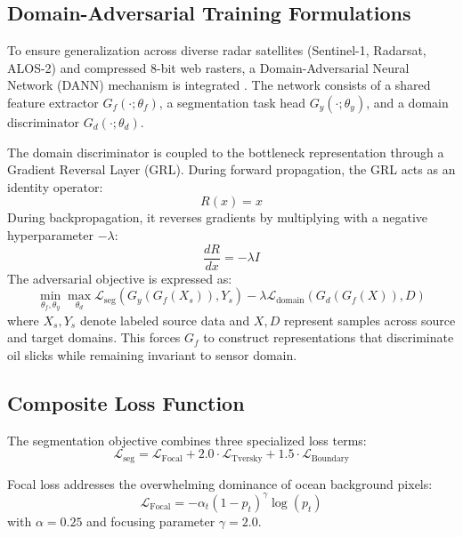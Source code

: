 \documentclass[conference]{IEEEtran}
\begin{document}
\subsection{Domain-Adversarial Training Formulations}
To ensure generalization across diverse radar satellites (Sentinel-1, Radarsat, ALOS-2) and compressed 8-bit web rasters, a Domain-Adversarial Neural Network (DANN) mechanism is integrated \cite{ganin2016domain}. The network consists of a shared feature extractor $G_f(\cdot; \theta_f)$, a segmentation task head $G_y(\cdot; \theta_y)$, and a domain discriminator $G_d(\cdot; \theta_d)$.

The domain discriminator is coupled to the bottleneck representation through a Gradient Reversal Layer (GRL). During forward propagation, the GRL acts as an identity operator:
\begin{equation}
R(x) = x
\label{eq:grl_forward}
\end{equation}
During backpropagation, it reverses gradients by multiplying with a negative hyperparameter $-\lambda$:
\begin{equation}
\frac{dR}{dx} = -\lambda I
\label{eq:grl_backward}
\end{equation}
The adversarial objective is expressed as:
\begin{equation}
\min_{\theta_f, \theta_y} \max_{\theta_d} \mathcal{L}_{\text{seg}}(G_y(G_f(X_s)), Y_s) - \lambda \mathcal{L}_{\text{domain}}(G_d(G_f(X)), D)
\label{eq:dann_objective}
\end{equation}
where $X_s, Y_s$ denote labeled source data and $X, D$ represent samples across source and target domains. This forces $G_f$ to construct representations that discriminate oil slicks while remaining invariant to sensor domain.

\subsection{Composite Loss Function}
The segmentation objective combines three specialized loss terms:
\begin{equation}
\mathcal{L}_{\text{seg}} = \mathcal{L}_{\text{Focal}} + 2.0 \cdot \mathcal{L}_{\text{Tversky}} + 1.5 \cdot \mathcal{L}_{\text{Boundary}}
\label{eq:comp_loss}
\end{equation}

Focal loss addresses the overwhelming dominance of ocean background pixels:
\begin{equation}
\mathcal{L}_{\text{Focal}} = -\alpha_t (1 - p_t)^\gamma \log(p_t)
\label{eq:focal_loss}
\end{equation}
with $\alpha = 0.25$ and focusing parameter $\gamma = 2.0$.
\end{document}
